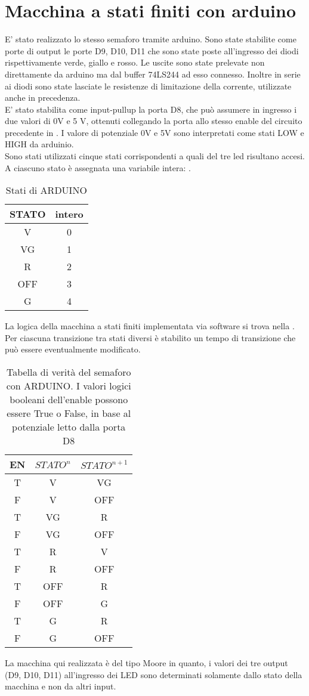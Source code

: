 \section{Macchina a stati finiti con arduino}
E' stato realizzato lo stesso semaforo tramite arduino.
Sono state stabilite come porte di output le porte D9, D10, D11 che sono state poste all'ingresso dei diodi rispettivamente verde, giallo e rosso. Le uscite sono state prelevate non direttamente da arduino ma dal buffer 74LS244 ad esso connesso. Inoltre in serie ai diodi sono state lasciate le resistenze di limitazione della corrente, utilizzate anche in precedenza.\\
E' stato stabilita come input-pullup la porta D8, che può assumere in ingresso i due valori di 0V e 5 V, ottenuti collegando la porta allo stesso enable del circuito precedente in . I valore di potenziale  0V e 5V sono interpretati come stati LOW e HIGH da arduinio.\\ 
Sono stati utilizzati cinque stati corrispondenti a quali del tre led risultano accesi. A ciascuno stato è assegnata una variabile intera: .
\begin{table}[h]
	\centering
	\begin{tabular}{cc}		
		 STATO& intero\\
		 \midrule 
		 V & 0\\
		VG & 1\\
		R &  2\\
		OFF & 3\\
		G & 4\\ 
		          
 	\end{tabular}
	\caption{ Stati di ARDUINO }
	\label{t:stati_arduino}
\end{table}
La logica della macchina a stati finiti implementata via software si trova nella . Per ciascuna transizione tra stati diversi è stabilito un tempo di transizione che può essere eventualmente modificato. 
\begin{table}[h]
	\centering
	\begin{tabular}{ccc}		
		 EN& $STATO^{n}$& $STATO^{n+1}$\\
		 \midrule 
		 T & V &  VG\\
		 F & V & OFF\\
		 T & VG & R\\
		 F & VG & OFF\\
		 T & R & V\\
		 F & R & OFF\\
		 T & OFF & R\\
		 F & OFF & G\\
		 T & G & R\\
		 F & G & OFF\\
		          
 	\end{tabular}
	\caption{ Tabella di verità del semaforo con ARDUINO. I valori logici booleani dell'enable possono essere True o False, in base al potenziale letto dalla porta D8 }
	\label{t:semaforo_arduino}
\end{table}

La macchina qui realizzata è del tipo Moore in quanto, i valori dei tre output (D9, D10, D11) all'ingresso dei LED sono determinati solamente dallo stato della macchina e non da altri input.\\

